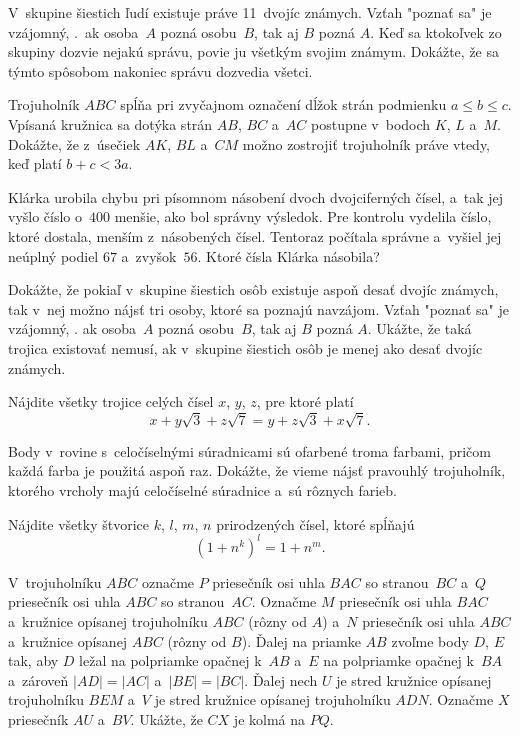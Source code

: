 {%
V~skupine šiestich ľudí existuje
práve 11~dvojíc známych. Vzťah "poznať sa" je
vzájomný, \tj.~ak osoba~$A$ pozná osobu~$B$, tak aj $B$ pozná $A$.
Keď sa ktokoľvek zo skupiny dozvie
nejakú správu, povie ju všetkým svojim známym.
Dokážte, že sa týmto spôsobom nakoniec správu dozvedia
všetci.}

{%
Trojuholník $ABC$ spĺňa pri zvyčajnom
označení dĺžok strán podmienku $a\le b\le c$.
Vpísaná kružnica sa dotýka strán $AB$,
$BC$ a~$AC$ postupne v~bodoch $K$,
$L$ a~$M$. Dokážte, že z~úsečiek
$AK$, $BL$ a~$CM$ možno zostrojiť trojuholník
práve vtedy, keď platí $b+c<3a$.}

{%
Klárka urobila chybu pri písomnom násobení dvoch
dvojciferných čísel, a~tak jej vyšlo číslo o~$400$
menšie, ako bol správny výsledok. Pre kontrolu
vydelila číslo, ktoré dostala, menším
z~násobených čísel. Tentoraz počítala správne
a~vyšiel jej neúplný podiel $67$ a~zvyšok~$56$. Ktoré
čísla Klárka násobila?}

{%
Dokážte, že pokiaľ v~skupine
šiestich osôb existuje aspoň desať dvojíc známych, tak v~nej
možno nájsť tri osoby, ktoré sa poznajú navzájom.
Vzťah "poznať sa" je
vzájomný, \tj. ak osoba~$A$ pozná osobu~$B$, tak aj $B$ pozná $A$. Ukážte, že taká
trojica existovať nemusí, ak v~skupine šiestich osôb
je menej ako desať dvojíc známych.}

{%
Nájdite všetky trojice celých čísel $x$, $y$, $z$, pre
ktoré platí
$$
x+y\sqrt3+z\sqrt7=y+z\sqrt3+x\sqrt7.
$$}

{%
Body v~rovine s~celočíselnými súradnicami sú ofarbené troma farbami, pričom každá farba je použitá aspoň raz. Dokážte, že vieme nájsť pravouhlý trojuholník, ktorého vrcholy majú celočíselné súradnice a~sú rôznych farieb.}

{%
Nájdite všetky štvorice $k$, $l$, $m$, $n$ prirodzených čísel, ktoré spĺňajú
$$
(1+n^k)^l=1+n^m.
$$}

{%
V~trojuholníku $ABC$ označme $P$ priesečník osi uhla $BAC$ so stranou~$BC$ a~$Q$ priesečník osi uhla $ABC$ so stranou~$AC$. Označme $M$ priesečník osi uhla $BAC$ a~kružnice opísanej trojuholníku $ABC$ (rôzny od $A$) a~$N$ priesečník osi uhla $ABC$ a~kružnice opísanej $ABC$ (rôzny od $B$). Ďalej na priamke $AB$ zvoľme body $D$, $E$ tak, aby $D$ ležal na polpriamke opačnej k~$AB$ a~$E$ na polpriamke opačnej k~$BA$ a~zároveň $|AD|=|AC|$ a~$|BE|=|BC|$. Ďalej nech $U$ je stred kružnice opísanej trojuholníku $BEM$ a~$V$ je stred kružnice opísanej trojuholníku $ADN$. Označme $X$ priesečník $AU$ a~$BV$. Ukážte, že $CX$ je kolmá na $PQ$.}

